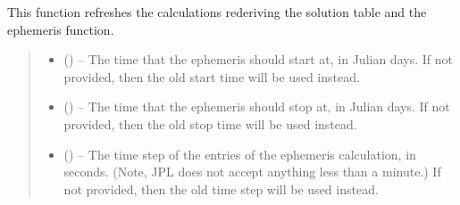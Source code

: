 \documentclass[letterpaper,11pt,english]{sphinxmanual}
\begin{document}
\begin{savenotes}
\begin{fulllineitems}
\begin{savenotes}\begin{fulllineitems}
\label{\detokenize{code/opihiexarata.ephemeris.jplhorizons:opihiexarata.ephemeris.jplhorizons.JPLHorizonsWebAPIEngine._refresh_ephemeris}}
\pysigstartsignatures
{}
\pysigstopsignatures
\sphinxAtStartPar
This function refreshes the calculations rederiving the solution
table and the ephemeris function.
\begin{quote}\begin{description}
\begin{itemize}
\item {} 
\sphinxAtStartPar
{} (\sphinxstyleliteralemphasis{\sphinxupquote{, }}) – The time that the ephemeris should start at, in Julian days. If
not provided, then the old start time will be used instead.

\item {} 
\sphinxAtStartPar
{} (\sphinxstyleliteralemphasis{\sphinxupquote{, }}) – The time that the ephemeris should stop at, in Julian days. If
not provided, then the old stop time will be used instead.

\item {} 
\sphinxAtStartPar
{} (\sphinxstyleliteralemphasis{\sphinxupquote{, }}) – The time step of the entries of the ephemeris calculation, in
seconds. (Note, JPL does not accept anything less than a minute.)
If not provided, then the old time step will be used instead.


\end{itemize}
\end{description}
\end{quote}
\end{fulllineitems}
\end{savenotes}
\end{fulllineitems}
\end{savenotes}
\end{document}
